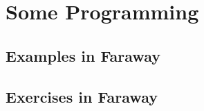 \documentclass[serif,mathserif,professionalfont]{beamer}
\begin{document}
%	
%	
%	






\section{Some Programming}


\subsection{Examples in Faraway}

\subsection{Exercises in Faraway}
\end{document}
